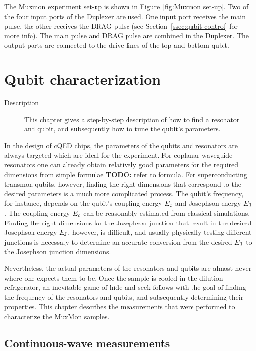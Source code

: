       The Muxmon experiment set-up is shown in Figure~\ref{fig:Muxmon set-up}. Two of the four input ports of the Duplexer are used. One input port receives the main pulse, the other receives the DRAG pulse (see Section~\ref{ssec:qubit control} for more info). The main pulse and DRAG pulse are combined in the Duplexer. The output ports are connected to the drive lines of the top and bottom qubit.

  \chapter{Qubit characterization}
    \begin{description}
     \item[Description] This chapter gives a step-by-step description of how to find a resonator and qubit, and subsequently how to tune the qubit's parameters.
     \end{description}

    In the design of cQED chips, the parameters of the qubits and resonators are always targeted which are ideal for the experiment.
    For coplanar waveguide resonators one can already obtain relatively good parameters for the required dimensions from simple formulae \textbf{TODO:} refer to formula.
    For superconducting transmon qubits, however, finding the right dimensions that correspond to the desired parameters is a much more complicated process.
    The qubit's frequency, for instance, depends on the qubit's coupling energy $E_\text{c}$ and Josephson energy $E_\text{J}$. The coupling energy $E_\text{c}$ can be reasonably estimated from classical simulations. Finding the right dimensions for the Josephson junction that result in the desired Josephson energy $E_\text{J}$, however, is difficult, and usually physically testing different junctions is necessary to determine an accurate conversion from the desired $E_\text{J}$ to the Josephson junction dimensions.

    Nevertheless, the actual parameters of the resonators and qubits are almost never where one expects them to be. Once the sample is cooled in the dilution refrigerator, an inevitable game of hide-and-seek follows with the goal of finding the frequency of the resonators and qubits, and subsequently determining their properties. This chapter describes the measurements that were performed to characterize the MuxMon samples.

    \section{Continuous-wave measurements}

